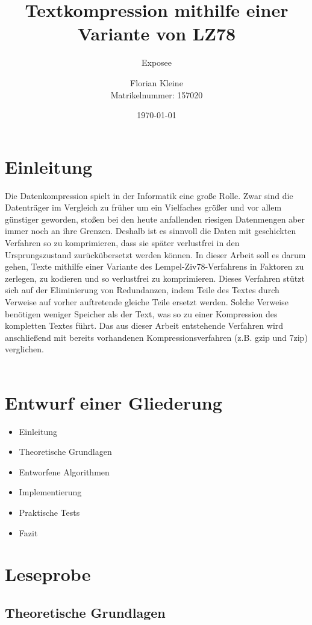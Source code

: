 \documentclass[a4paper,11pt]{scrartcl}%
\title{\vspace{2,5cm}Textkompression mithilfe einer Variante von LZ78}
\subtitle{Exposee}
\author{Florian Kleine\\Matrikelnummer: 157020}
\date{\today}
\theoremstyle{nonumberplain}
\theoremstyle{change}
\theoremstyle{nonumberplain}
\theoremstyle{change}
\theoremstyle{nonumberplain}
\begin{document}
\maketitle
\thispagestyle{empty}
\newpage
\tableofcontents
\newpage
\newpage
\section{Einleitung}

Die Datenkompression spielt in der Informatik eine große Rolle. Zwar sind die Datenträger im Vergleich zu früher um ein Vielfaches größer und vor allem günstiger geworden, stoßen bei den heute anfallenden riesigen Datenmengen aber immer noch an ihre Grenzen. Deshalb ist es sinnvoll die Daten mit geschickten Verfahren so zu komprimieren, dass sie später verlustfrei in den Ursprungszustand zurückübersetzt werden können.
In dieser Arbeit soll es darum gehen, Texte mithilfe einer Variante des Lempel-Ziv78-Verfahrens in Faktoren zu zerlegen, zu kodieren und so verlustfrei zu komprimieren. Dieses Verfahren stützt sich auf der Eliminierung von Redundanzen, indem Teile des Textes durch Verweise auf vorher auftretende gleiche Teile ersetzt werden. Solche Verweise benötigen weniger Speicher als der Text, was so zu einer Kompression des kompletten Textes führt.
Das aus dieser Arbeit entstehende Verfahren wird anschließend mit bereits vorhandenen Kompressionsverfahren (z.B. gzip und 7zip) verglichen.\\\\

\section{Entwurf einer Gliederung}

	\begin{itemize}
		\item Einleitung
		\item Theoretische Grundlagen
		\item Entworfene Algorithmen
		\item Implementierung
		\item Praktische Tests
		\item Fazit
	\end{itemize}
\newpage	
\section{Leseprobe}
	\subsection{Theoretische Grundlagen}
	
\end{document}
